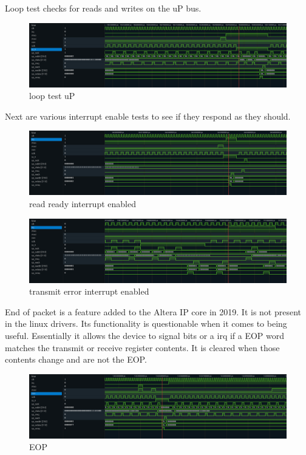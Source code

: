 \par
Loop test checks for reads and writes on the uP bus.
\begin{figure}[H]
\caption{loop test uP}
\centering
\includegraphics[width=\textwidth]{img/diagrams/waveform_loop_test_up.png}
\end{figure}

\par
Next are various interrupt enable tests to see if they respond as they should.
\begin{figure}[H]
\caption{read ready interrupt enabled}
\centering
\includegraphics[width=\textwidth]{img/diagrams/waveform_irrdy_up.png}
\end{figure}

\begin{figure}[H]
\caption{transmit error interrupt enabled}
\centering
\includegraphics[width=\textwidth]{img/diagrams/waveform_itoe_up.png}
\end{figure}

\par
End of packet is a feature added to the Altera IP core in 2019. It is not present in the linux drivers.
Its functionality is questionable when it comes to being useful. Essentially it allows the device to signal
bits or a irq if a EOP word matches the transmit or receive register contents. It is cleared when those
contents change and are not the EOP.
\begin{figure}[H]
\caption{EOP}
\centering
\includegraphics[width=\textwidth]{img/diagrams/waveform_eop_up.png}
\end{figure}

